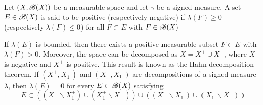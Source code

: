 \begin{definition}
	Let $(X, \mathscr{B}(X))$ be a measurable space and let $\gamma$ be a signed measure. A set $E\in\mathscr{B}(X)$ is said to be positive (respectively negative) if $\lambda(F)\geq 0$ (respectively $\lambda(F)\leq 0$) for all $F\subset E$ with $F\in \mathscr{B}(X)$
\end{definition}
If $\lambda(E)$ is bounded, then there exists a positive measurable subset $F\subset E$ with $\lambda(F)>0$. Moreover, the space can be decomposed as $X=X^+\cup X^-$, where $X^-$ is negative and $X^+$ is positive. This result is known as the Hahn decomposition theorem. 
If $(X^+, X^+_1)$ and $(X^-, X^-_1)$ are decompositions of a signed measure $\lambda$, then $\lambda(E)=0$ for every $E\subset\mathscr{B}(X)$ satisfying
\begin{equation*}
E\subset((X^+\backslash X^+_1)\cup(X^+_1\backslash X^+))\cup((X^-\backslash X^-_1)\cup(X^-_1\backslash X^-))
\end{equation*}

